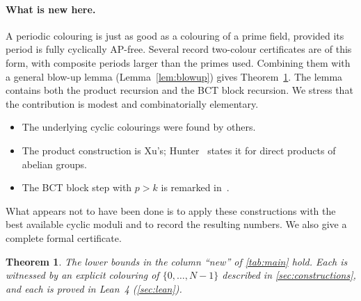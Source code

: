 \documentclass[11pt]{article}
\numberwithin{equation}{section}
\newtheorem{theorem}{Theorem}[section]
\theoremstyle{definition}
\theoremstyle{remark}
\begin{document}
\paragraph{What is new here.}
A periodic colouring is just as good as a colouring of a prime field, provided its period is
fully cyclically AP-free.  Several record two-colour certificates are of this form, with
composite periods larger than the primes used.  Combining them with a general blow-up lemma
(Lemma~\ref{lem:blowup}) gives Theorem~\ref{thm:main}.  The lemma contains both the product recursion and the
BCT block recursion.  We stress that the contribution is modest and combinatorially elementary.
\begin{itemize}
\item The underlying cyclic colourings were found by others.
\item The product construction is Xu's; Hunter~\cite[Lemma~3.2]{Hun23} states it for direct
  products of abelian groups.
\item The BCT block step with $p>k$ is remarked in~\cite{BCT18}.
\end{itemize}
What appears not to have been done is to apply these constructions with the best available
cyclic moduli and to record the resulting numbers.  We also give a complete formal
certificate.

\begin{theorem}\label{thm:main}
The lower bounds in the column ``new'' of \cref{tab:main} hold.  Each is witnessed by an explicit
colouring of $\{0,\dots,N-1\}$ described in \cref{sec:constructions}, and each is proved in Lean~4
(\cref{sec:lean}).
\end{theorem}
\end{document}

